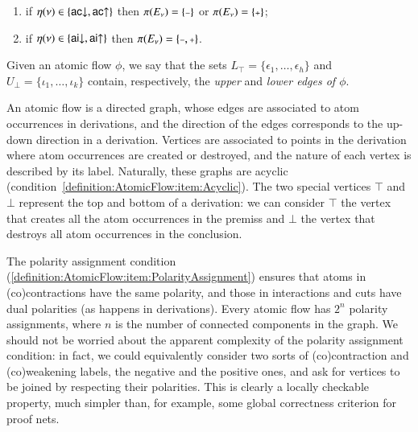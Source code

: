\begin{definition}
\begin{enumerate}
\begin{enumerate}
\item if $\eta(\nu)\in\{{{\mathsf{ac}}{\downarrow}},{{\mathsf{ac}}{\uparrow}}\}$ then $\pi(E_\nu)=\{\pmi\}$ or $\pi(E_\nu)=\{\ppl\}$;
\item if $\eta(\nu)\in\{{{\mathsf{ai}}{\downarrow}},{{\mathsf{ai}}{\uparrow}}\}$ then $\pi(E_\nu)=\{\pmi,\ppl\}$.
\end{enumerate}
\end{enumerate}
Given an atomic flow $\phi$, we say that the sets $L_\top=\{\epsilon_1,\dots,\epsilon_h\}$ and $U_\bot=\{\iota_1,\dots,\iota_k\}$ contain, respectively, the \emph{upper} and \emph{lower edges of $\phi$}.
\end{definition}

An atomic flow is a directed graph, whose edges are associated to atom occurrences in derivations, and the direction of the edges corresponds to the up-down direction in a derivation. Vertices are associated to points in the derivation where atom occurrences are created or destroyed, and the nature of each vertex is described by its label. Naturally, these graphs are acyclic (condition~\ref{definition:AtomicFlow:item:Acyclic}). The two special vertices $\top$ and $\bot$ represent the top and bottom of a derivation: we can consider $\top$ the vertex that creates all the atom occurrences in the premiss and $\bot$ the vertex that destroys all atom occurrences in the conclusion.

The polarity assignment condition (\ref{definition:AtomicFlow:item:PolarityAssignment}) ensures that atoms in (co)contractions have the same polarity, and those in interactions and cuts have dual polarities (as happens in derivations). Every atomic flow has $2^n$ polarity assignments, where $n$ is the number of connected components in the graph. We should not be worried about the apparent complexity of the polarity assignment condition: in fact, we could equivalently consider two sorts of (co)contraction and (co)weakening labels, the negative and the positive ones, and ask for vertices to be joined by respecting their polarities. This is clearly a locally checkable property, much simpler than, for example, some global correctness criterion for proof nets.

